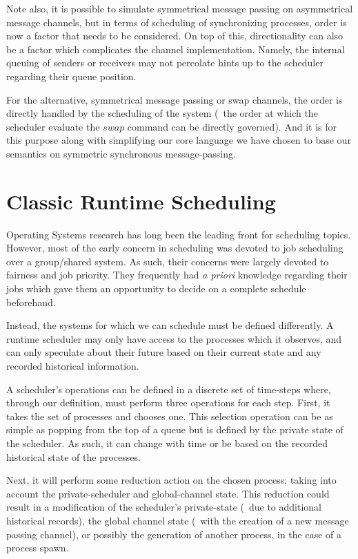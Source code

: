 Note also, it is possible to simulate symmetrical message passing on asymmetrical 
message channels, but in terms of scheduling of synchronizing processes, order 
is now a factor that needs to be considered. On top of this, directionality can 
also be a factor which complicates the channel implementation. Namely, the 
internal queuing of senders or receivers may not percolate hints up to the 
scheduler regarding their queue position. 

For the alternative, symmetrical message passing or swap channels, the order is 
directly handled by the scheduling of the system (\ie~the order at which the 
scheduler evaluate the $swap$ command can be directly governed). And it is for 
this purpose along with simplifying our core language we have chosen to base our
semantics on symmetric synchronous message-passing. 

\section{Classic Runtime Scheduling}\label{sec:classic runtime scheduling}

Operating Systems research has long been the leading front for scheduling topics. 
However, most of the early concern in scheduling was devoted to job scheduling 
over a group/shared system. As such, their concerns were largely devoted to 
fairness and job priority. They frequently had {\sl a priori} knowledge regarding
their jobs which gave them an opportunity to decide on a complete schedule 
beforehand.

Instead, the systems for which we can schedule must be defined differently.
A runtime scheduler may only have access to the processes which it observes, 
and can only speculate about their future based on their current state and any
recorded historical information.

A scheduler's operations can be defined in a discrete set of time-steps where,
through our definition, must perform three operations for each step. First, it takes 
the set of processes and chooses one. This selection operation 
can be as simple as popping from the top of a queue but
is defined by the private state of the scheduler. As such, it can change with 
time or be based on the recorded historical state of the processes.
 
Next, it will perform some reduction action on the chosen process;
taking into account the private-scheduler and global-channel state. This
reduction could result in a modification of the 
scheduler's private-state (\ie~due to additional historical records), 
the global channel state (\ie~with the creation of a new message passing channel), 
or possibly the 
generation of another process, in the case of a process spawn. 

